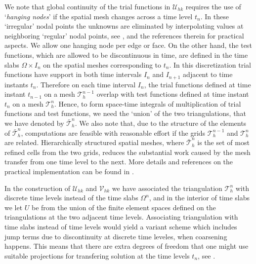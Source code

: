 \documentclass{amsart}
\numberwithin{equation}{section}
\theoremstyle{definition}
\begin{document}
We note that global continuity of the trial functions in ${\mathcal U}_{hk}$ 
requires the use of `\textit{hanging nodes}' if the spatial mesh changes 
across a time level $t_n$. 
In these `irregular' nodal points the unknowns are 
eliminated by interpolating values at neighboring `regular' nodal points, 
see \cite{BangerthGeigerRannacher}, \cite{Svensson2006} 
and the references therein for practical aspects. 
We allow one hanging node per edge or face.
On the other hand, 
the test functions, which are allowed to be discontinuous in time, 
are defined in the time slabs $\Omega\times I_n$ on the spatial meshes corresponding 
to $t_n$. 
In this discretization trial functions have
support in both time intervals $I_n$ and $I_{n+1}$ adjacent to time instants $t_n$. 
Therefore on each time interval $I_n$, the trial functions defined at time 
instant $t_{n-1}$ on a mesh ${\mathcal T}_h^{n-1}$ overlap with test functions defined 
at time instant $t_n$ on a mesh ${\mathcal T}_h^n$.  
Hence, 
to form space-time integrals of multiplication of trial functions and test functions,  
we need the `union' of the two triangulations, that we have denoted by $\bar{\mathcal T}_h^n$. 
 We also note that, due to the structure of the elements of 
 $\bar{\mathcal T}_h^n$, computations are feasible with reasonable effort if the grids 
 ${\mathcal T}_h^{n-1}$ and  ${\mathcal T}_h^n$ are related. Hierarchically structured spatial 
meshes, where  $\bar{\mathcal T}_h^n$ is the set of most refined cells from the two grids, 
reduces the substantial work caused by the mesh transfer  from 
one time level to the next. 
More details and references on the practical implementation  
can be found in \cite{BangerthGeigerRannacher}.

In the construction of ${\mathcal U}_{hk}$ and ${\mathcal V}_{hk}$ we have associated
the triangulation ${\mathcal T}_h^n$ with discrete time levels instead of the time
slabs $\Omega^n$, and in the interior of time slabs we let $U$ be from the
union of the finite element spaces defined on the triangulations at the
two adjacent time levels.
Associating triangulation with time slabs instead of time levels would
yield a variant scheme which includes jump terms due to discontinuity
at discrete time leveles, when coarsening happens.
This means that there are extra degrees of freedom that one might use
suitable projections for transfering solution at the time levels $t_n$,
 see \cite{StigFardin}.
\end{document}
